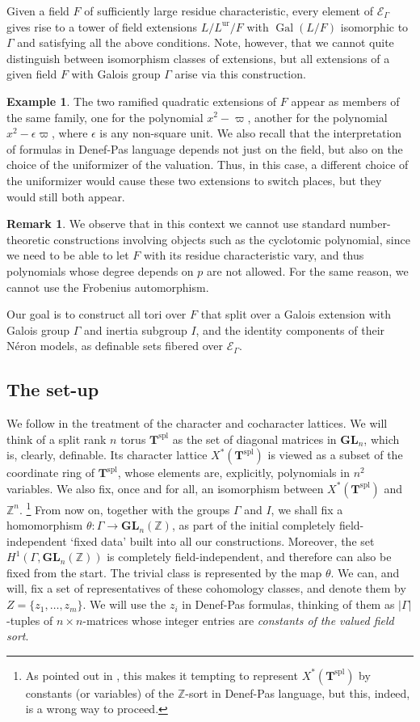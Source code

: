 \documentclass{amsart}
\newcommand{\Z}{{\mathbb Z}}
\newcommand{\GL}{\mathbf {GL}}
\newcommand{\gal}{\operatorname{Gal}}
\newcommand{\ur}{\mathrm{ur}}
\newcommand{\bT}{\mathbf {T}}
\newcommand\cE{{\mathcal E}}
\newcommand\spl{\mathrm{spl}}
\theoremstyle{plain}
\theoremstyle{definition}
\newtheorem{rem}[thm]{Remark}
\newtheorem{example}[thm]{Example}
\begin{document}
Given a field $F$ of sufficiently large residue characteristic, every element of $\cE_\Gamma$ gives rise to a tower of field extensions $L/L^\ur/F$ with $\gal(L/F)$ isomorphic to $\Gamma$ and satisfying all the above conditions. Note, however, that we cannot quite distinguish between 
isomorphism classes of extensions, but all extensions of a given field $F$ with Galois group 
$\Gamma$ arise via this construction.   
\begin{example}
The two ramified quadratic extensions of $F$ appear as members of the same family, one for the 
polynomial $x^2-\varpi$, another for the polynomial $x^2-\epsilon\varpi$, where $\epsilon$  is any non-square unit. We also recall that the interpretation of formulas in Denef-Pas language depends not just on the field, but also on the choice of the uniformizer of the valuation. Thus, in this case, a different choice of the uniformizer would cause these two extensions to switch places, but they would still both appear. 
\end{example}
\begin{rem} We observe that in this context we cannot use standard number-theoretic constructions involving objects such as the cyclotomic polynomial, since we need to be able to let $F$ with its residue characteristic vary, and thus polynomials whose degree depends on $p$ are not allowed. For the same reason, we cannot use the Frobenius automorphism.  
\end{rem}
Our goal is to construct all tori over $F$ that split over a Galois extension with Galois group 
$\Gamma$ and inertia subgroup $I$, and the identity components of their N\'eron models, as 
definable sets fibered over $\cE_\Gamma$.  

\subsection{The set-up}
We follow \cite{cluckers-hales-loeser} in the treatment of the character and cocharacter lattices.
We will think of a split rank $n$ torus ${\bT}^\spl$ as the set of diagonal matrices in $\GL_n$, which is, clearly, definable. Its character lattice $X^\ast({\bT}^\spl)$ is viewed as a subset of the coordinate ring of $\bT^\spl$, whose elements are, explicitly, polynomials in $n^2$ variables. 
We also fix, once and for all, an isomorphism between $X^\ast(\bT^\spl)$ and $\Z^n$. 
\footnote{As pointed out in \cite{cluckers-hales-loeser}, this makes it tempting to represent 
$X^\ast(\bT^\spl)$ by constants (or variables) of the $\Z$-sort in Denef-Pas language, but this, indeed, is a wrong way to proceed.}
From now on, together with the groups $\Gamma$ and $I$, we shall fix a homomorphism
$\theta:\Gamma \to \GL_n(\Z)$, as part of the initial completely field-independent `fixed data' built into all our constructions.
Moreover, the set $H^1(\Gamma, \GL_n(\Z))$ is completely field-independent, and therefore can also be fixed from the start. The trivial class is represented by the map $\theta$.  We can, and will, fix a set of representatives of these cohomology classes, and denote them by $Z=\{z_1, \dots, z_m\}$. We will use the $z_i$ in Denef-Pas formulas, thinking of them as $|\Gamma|$-tuples of $n\times n$-matrices whose integer entries are \emph{constants of the valued  field sort}. 
 
\end{document}
